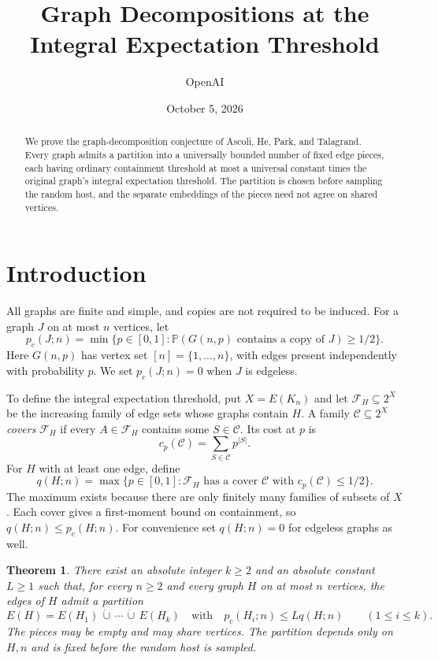 \documentclass[11pt]{article}
\title{Graph Decompositions at the Integral Expectation Threshold}
\author{OpenAI}
\date{October 5, 2026}
\newtheorem{theorem}{Theorem}[section]
\theoremstyle{remark}
\numberwithin{equation}{section}
\newcommand{\Prob}{\mathbb P}
\newcommand{\calF}{\mathcal F}
\begin{document}
\maketitle

\begin{abstract}
We prove the graph-decomposition conjecture of Ascoli, He, Park,
and Talagrand. Every graph admits a partition into a universally
bounded number of fixed edge pieces, each having ordinary containment
threshold at most a universal constant times the original graph's
integral expectation threshold. The partition is chosen before
sampling the random host, and the separate embeddings of the pieces
need not agree on shared vertices.
\end{abstract}

\section{Introduction}
\label{sec:intro}

All graphs are finite and simple, and copies are not required to
be induced. For a graph $J$ on at most $n$ vertices, let
\[
 p_c(J;n)=\min\{p\in[0,1]:
           \Prob(G(n,p)\text{ contains a copy of }J)\geq1/2\}.
\]
Here $G(n,p)$ has vertex set $[n]=\{1,\ldots,n\}$, with edges
present independently with probability $p$. We set $p_c(J;n)=0$
when $J$ is edgeless.

To define the integral expectation threshold, put $X=E(K_n)$ and
let $\calF_H\subseteq2^X$ be the increasing family of edge sets
whose graphs contain $H$. A family $\mathcal C\subseteq2^X$
\emph{covers} $\calF_H$ if every $A\in\calF_H$ contains some
$S\in\mathcal C$. Its cost at $p$ is
\[
 c_p(\mathcal C)=\sum_{S\in\mathcal C}p^{|S|}.
\]
For $H$ with at least one edge, define
\begin{equation}\label{eq:q-definition}
 q(H;n)=\max\{p\in[0,1]:
    \calF_H\text{ has a cover }\mathcal C
    \text{ with }c_p(\mathcal C)\leq1/2\}.
\end{equation}
The maximum exists because there are only finitely many families
of subsets of $X$. Each cover gives a first-moment bound on
containment, so $q(H;n)\leq p_c(H;n)$. For convenience set
$q(H;n)=0$ for edgeless graphs as well.

\begin{theorem}\label{thm:main}
There exist an absolute integer $k\geq2$ and an absolute constant
$L\geq1$ such that, for every $n\geq2$ and every graph $H$ on
at most $n$ vertices, the edges of $H$ admit a partition
\[
 E(H)=E(H_1)\,\dot\cup\,\cdots\,\dot\cup\,E(H_k)
 \quad\text{with}\quad
 p_c(H_i;n)\leq Lq(H;n)\qquad(1\leq i\leq k).
\]
The pieces may be empty and may share vertices. The partition
depends only on $H,n$ and is fixed before the random host is sampled.
\end{theorem}
\end{document}

